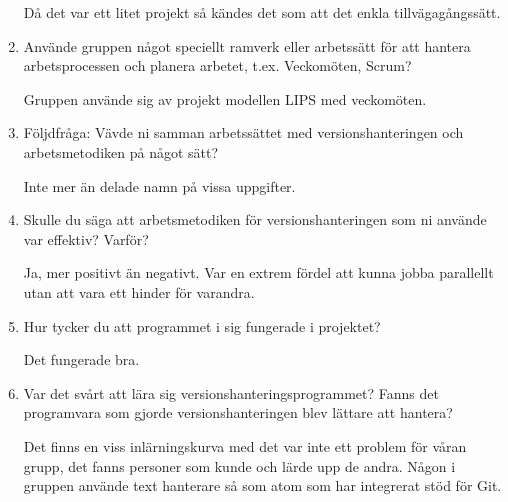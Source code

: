 \begin{enumerate}
  Då det var ett litet projekt så kändes det som att det enkla tillvägagångssätt.

  \item Använde gruppen något speciellt ramverk eller arbetssätt för att hantera arbetsprocessen och planera arbetet, t.ex. Veckomöten, Scrum?

  Gruppen använde sig av projekt modellen LIPS med veckomöten.

  \item Följdfråga: Vävde ni samman arbetssättet med versionshanteringen och arbetsmetodiken på något sätt?

  Inte mer än delade namn på vissa uppgifter.

  \item Skulle du säga att arbetsmetodiken för versionshanteringen som ni använde var effektiv? Varför?

  Ja, mer positivt än negativt. Var en extrem fördel att kunna jobba parallellt utan att vara ett hinder för varandra.

  \item Hur tycker du att programmet i sig fungerade i projektet?

  Det fungerade bra.

  \item Var det svårt att lära sig versionshanteringsprogrammet? Fanns det programvara som gjorde versionshanteringen blev lättare att hantera?

  Det finns en viss inlärningskurva med det var inte ett problem för våran grupp, det fanns personer som kunde och lärde upp de andra. Någon i gruppen använde text hanterare så som atom som har integrerat stöd för Git.

\end{enumerate}






